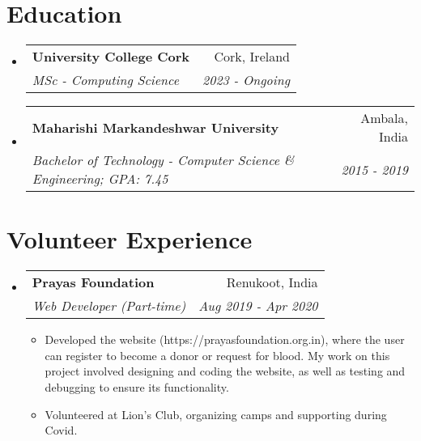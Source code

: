 \documentclass[a4paper,20pt]{article}
\makeatletter
\newcommand{\resumeItemWithoutTitle}[1]{
  \item\small{
    {#1\vspace{-2pt}}
  }
}
\newcommand{\resumeSubheading}[4]{
  \vspace{-1pt}\item
    \begin{tabular*}{0.97\textwidth}{l@{\extracolsep{\fill}}r}
      \textbf{#1} & #2 \\
      \textit{#3} & \textit{#4} \\
    \end{tabular*}\vspace{-5pt}
}
\newcommand{\resumeSubHeadingListStart}{\begin{itemize}[leftmargin=*]}
\newcommand{\resumeSubHeadingListEnd}{\end{itemize}}
\newcommand{\resumeItemListStart}{\begin{itemize}}
\newcommand{\resumeItemListEnd}{\end{itemize}\vspace{-5pt}}
\makeatother
\begin{document}
\section{Education}
\resumeSubHeadingListStart
\resumeSubheading
{University College Cork}{Cork, Ireland}
{MSc - Computing Science}{2023 - Ongoing}
\vspace{2pt}
\resumeSubheading
{Maharishi Markandeshwar University}{Ambala, India}
{Bachelor of Technology - Computer Science \& Engineering;  GPA: 7.45}{2015 - 2019}
\resumeSubHeadingListEnd
\vspace{-5pt}

\section{Volunteer Experience}
\resumeSubHeadingListStart
\resumeSubheading{Prayas Foundation}{Renukoot, India}
{Web Developer (Part-time)}{Aug 2019 - Apr 2020}
\resumeItemListStart
\resumeItemWithoutTitle{Developed the website (https://prayasfoundation.org.in), where the user can register to become a donor or request for blood. My work on this project involved designing and coding the website, as well as testing and debugging to ensure its
functionality.}
\resumeItemWithoutTitle{Volunteered at Lion's Club, organizing camps and supporting during Covid.}
\resumeItemListEnd
\resumeSubHeadingListEnd
\end{document}
